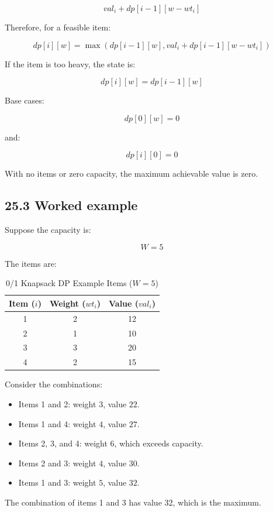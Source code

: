 \[
val_i+dp[i-1][w-wt_i]
\]


Therefore, for a feasible item:


\[
\boxed{ dp[i][w]= \max\left( dp[i-1][w], val_i+dp[i-1][w-wt_i] \right) }
\]


If the item is too heavy, the state is:


\[
\boxed{dp[i][w]=dp[i-1][w]}
\]


Base cases:


\[
dp[0][w]=0
\]


and:


\[
dp[i][0]=0
\]


With no items or zero capacity, the maximum achievable value is zero.

\subsection{25.3 Worked example}

Suppose the capacity is:


\[
W=5
\]


The items are:

\begin{table}[htbp]
\centering
\caption{0/1 Knapsack DP Example Items ($W = 5$)}
\label{tab:knapsack_dp_items}
\begin{tabular}{ccc}
\toprule
\textbf{Item ($i$)} & \textbf{Weight ($wt_i$)} & \textbf{Value ($val_i$)} \\
\midrule
1 & 2 & 12 \\
2 & 1 & 10 \\
3 & 3 & 20 \\
4 & 2 & 15 \\
\bottomrule
\end{tabular}
\end{table}

Consider the combinations:

\begin{itemize}
    \item Items 1 and 2: weight $3$, value $22$.
    \item Items 1 and 4: weight $4$, value $27$.
    \item Items 2, 3, and 4: weight $6$, which exceeds capacity.
    \item Items 2 and 3: weight $4$, value $30$.
    \item Items 1 and 3: weight $5$, value $32$.
\end{itemize}

The combination of items 1 and 3 has value 32, which is the maximum.


